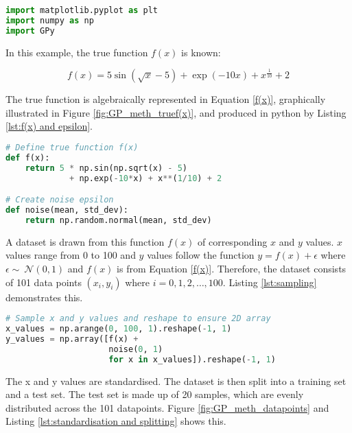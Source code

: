 \documentclass[12pt,a4paper]{article}
\begin{document}
\vspace{10pt}
\begin{lstlisting}[language=python, caption={Code of importing packages.}, label={lst:importing packages}]
import matplotlib.pyplot as plt
import numpy as np
import GPy
\end{lstlisting}

In this example, the true function \(f(x)\) is known:

\begin{equation}
f(x) = 5 \sin\left(\sqrt{x} - 5\right) + \exp(-10x) + x^{\frac{1}{10}} + 2
\label{f(x)}
\end{equation}

The true function is algebraically represented in Equation \eqref{f(x)}, graphically illustrated in Figure \ref{fig:GP_meth_truef(x)}, and produced in python by Listing \ref{lst:f(x) and epsilon}.

\vspace{10pt}
\begin{lstlisting}[language=python, caption={Code of the creation of the function f(x) and noise epsilon.}, label={lst:f(x) and epsilon}]
# Define true function f(x)
def f(x):
    return 5 * np.sin(np.sqrt(x) - 5)
             + np.exp(-10*x) + x**(1/10) + 2

# Create noise epsilon
def noise(mean, std_dev):
    return np.random.normal(mean, std_dev)

\end{lstlisting}

A dataset is drawn from this function \(f(x)\) of corresponding \(x\) and \(y\) values. \(x\) values range from 0 to 100 and \(y\) values follow the function \(y=f(x)+\epsilon\) where \(\epsilon \sim \ \mathcal{N}(0, 1)\) and \(f(x)\) is from Equation \ref{f(x)}. Therefore, the dataset consists of 101 data points \((x_i, y_i)\) where \( i = 0, 1, 2, \dots, 100 \). Listing \ref{lst:sampling} demonstrates this.

\vspace{20pt}
\begin{lstlisting}[language=python, caption={Code of sampling x and  y values.}, label={lst:sampling}]
# Sample x and y values and reshape to ensure 2D array
x_values = np.arange(0, 100, 1).reshape(-1, 1)  
y_values = np.array([f(x) + 
                     noise(0, 1)
                     for x in x_values]).reshape(-1, 1)
\end{lstlisting}

The x and y values are standardised. The dataset is then split into a training set and a test set. The test set is made up of 20 samples, which are evenly distributed across the 101 datapoints. Figure \ref{fig:GP_meth_datapoints} and Listing \ref{lst:standardisation and splitting} shows this.
\end{document}
